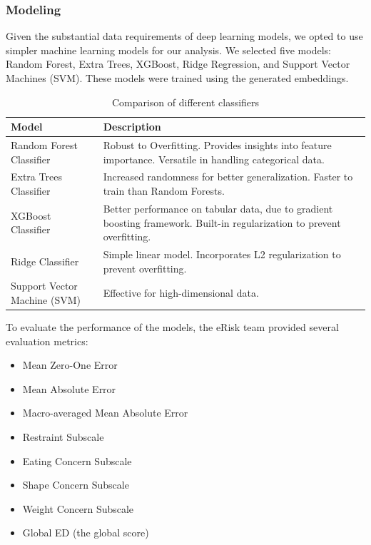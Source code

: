 \documentclass[]{style/ceurart}
\begin{document}
\subsubsection{Modeling}

Given the substantial data requirements of deep learning models, we opted to use simpler machine learning models for our analysis. We selected five models: Random Forest, Extra Trees, XGBoost, Ridge Regression, and Support Vector Machines (SVM). These models were trained using the generated embeddings.

\begin{table}[h]
\centering
\caption{Comparison of different classifiers}
\renewcommand{\arraystretch}{1.2}
\begin{tabular}{@{}lp{10cm}@{}}
\toprule
\textbf{Model} & \textbf{Description} \\ \midrule
Random Forest Classifier & Robust to Overfitting. Provides insights into feature importance. Versatile in handling categorical data. \\ \midrule
Extra Trees Classifier & Increased randomness for better generalization. Faster to train than Random Forests. \\ \midrule
XGBoost Classifier & Better performance on tabular data, due to gradient boosting framework. Built-in regularization to prevent overfitting. \\ \midrule
Ridge Classifier & Simple linear model. Incorporates L2 regularization to prevent overfitting. \\ \midrule
Support Vector Machine (SVM) & Effective for high-dimensional data. \\ \bottomrule
\end{tabular}
\end{table}

To evaluate the performance of the models, the eRisk team provided several evaluation metrics:
\begin{itemize}
    \item Mean Zero-One Error
    \item Mean Absolute Error
    \item Macro-averaged Mean Absolute Error
    \item Restraint Subscale
    \item Eating Concern Subscale
    \item Shape Concern Subscale
    \item Weight Concern Subscale
    \item Global ED (the global score)
\end{itemize}
\end{document}
